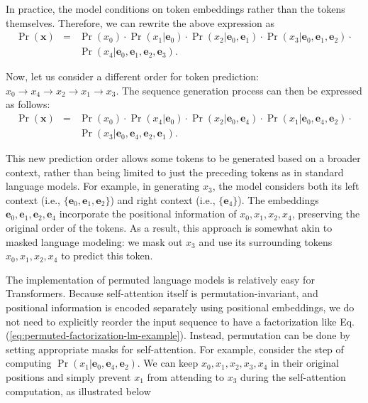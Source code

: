 \noindent In practice, the model conditions on token embeddings rather than the tokens themselves. Therefore, we can rewrite the above expression as
\begin{eqnarray}
\Pr(\mathbf{x}) & = & \Pr(x_0) \cdot \Pr(x_1|\mathbf{e}_0) \cdot \Pr(x_2|\mathbf{e}_0,\mathbf{e}_1) \cdot \Pr(x_3|\mathbf{e}_0,\mathbf{e}_1, \mathbf{e}_2) \cdot \nonumber \\
                &   & \Pr(x_4|\mathbf{e}_0, \mathbf{e}_1, \mathbf{e}_2, \mathbf{e}_3).
\end{eqnarray}


Now, let us consider a different order for token prediction: $x_0 \to x_4 \to x_2 \to x_1 \to x_3$. The sequence generation process can then be expressed as follows:
\begin{eqnarray}
\Pr(\mathbf{x}) & = & \Pr(x_0) \cdot \Pr(x_4|\mathbf{e}_0) \cdot \Pr(x_2|\mathbf{e}_0, \mathbf{e}_4) \cdot \Pr(x_1|\mathbf{e}_0, \mathbf{e}_4, \mathbf{e}_2) \cdot \nonumber \\
                &   & \Pr(x_3|\mathbf{e}_0, \mathbf{e}_4, \mathbf{e}_2, \mathbf{e}_1) \label{eq:permuted-factorization-lm-example}.
\end{eqnarray}

This new prediction order allows some tokens to be generated based on a broader context, rather than being limited to just the preceding tokens as in standard language models. For example, in generating $x_3$, the model considers both its left context (i.e., $\{\mathbf{e}_0, \mathbf{e}_1, \mathbf{e}_2\}$) and right context (i.e., $\{\mathbf{e}_4\}$). The embeddings $\mathbf{e}_0, \mathbf{e}_1, \mathbf{e}_2, \mathbf{e}_4$ incorporate the positional information of $x_0, x_1, x_2, x_4$, preserving the original order of the tokens. As a result, this approach is somewhat akin to masked language modeling: we mask out $x_3$ and use its surrounding tokens $x_0, x_1, x_2, x_4$ to predict this token.

The implementation of permuted language models is relatively easy for Transformers. Because self-attention itself is permutation-invariant, and positional information is encoded separately using positional embeddings, we do not need to explicitly reorder the input sequence to have a factorization like Eq. (\ref{eq:permuted-factorization-lm-example}). Instead, permutation can be done by setting appropriate masks for self-attention. For example, consider the step of computing $\Pr(x_1 | \mathbf{e}_0, \mathbf{e}_4, \mathbf{e}_2)$. We can keep $x_0, x_1, x_2, x_3, x_4$ in their original positions and simply prevent $x_1$ from attending to $x_3$ during the self-attention computation, as illustrated below

